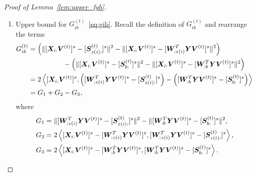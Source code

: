 \documentclass[lettersize,onecolumn,journal]{IEEEtran}
\theoremstyle{definition}
\theoremstyle{definition}
\newcommand{\of}[1]{\left(#1\right)}
\newcommand{\ang}[1]{\left\langle#1\right\rangle}
\begin{document}
\begin{proof}[Proof of Lemma~\ref{lem:upper_fgh}]
\begin{enumerate}
    Also note that 
    \begin{align}
        \onormSize{}{  [  \tilde \mS_{z(i):} ]^s - [  \tilde \mS_{b:} ]^s  }^2 &=  \onormSize{}{  [  \tilde \mS_{z(i):} ]^s -[ \mS_{z(i):} ]^s +  [ \mS_{z(i):} ]^s - [ \mS_{b:} ]^s + [ \mS_{b:} ]^s -[  \tilde \mS_{b:} ]^s  }^2 \\
        & \lesssim \onormSize{}{ [ \mS_{z(i):} ]^s - [ \mS_{b:} ]^s }^2 + \max_{a \in [r]} \onormSize{}{ [ \mS_{a:} ]^s -[  \tilde \mS_{a:} ]^s }^2 \\
        & \lesssim \onormSize{}{ [ \mS_{z(i):} ]^s - [ \mS_{b:} ]^s }^2  + \max_{a \in [r]} \frac{1}{\onormSize{}{\mS_{a:} }^2} \onormSize{}{ \mW_{:a}^T \mE \mV}^2\\
        & \lesssim \onormSize{}{ [ \mS_{z(i):} ]^s - [ \mS_{b:} ]^s }^2,
    \end{align}
    where the second inequality follows by Lemma~\ref{lem:norm_diff}, and the last inequality follows by the assumptions on $\onormSize{}{\mS_{a:}}$ in the parameter space~\eqref{eq:family}, the inequality~\eqref{eq:cond1} Condition~\ref{cond:origin} and the assumption $\Delta_{\min}^2 \gtrsim p^{-K/2}\log p$. 
    
    Therefore, we finish the proof of inequality~\eqref{eq:fib}.
    
    \item Upper bound for $G_{ib}^{(t)}$~\eqref{eq:gib}. Recall the definition of $G_{ib}^{(t)}$ and rearrange the terms
    \begin{align}
        G_{ib}^{(t)} &=   \of{ \onormSize{}{ [\mX_{i:} \mV^{(t)}]^s -  [  \mS_{z(i):}^{(t)}  ]^s}^2 -  \onormSize{}{ [\mX_{i:} \mV^{(t)}]^s -  [  \mW_{:z(i)}^T \mY \mV^{(t)} ]^s}^2}   \\
        & \quad \quad \quad \quad \quad -   \of{ \onormSize{}{ [\mX_{i:} \mV^{(t)}]^s -  [  \mS_{b:}^{(t)}  ]^s}^2 -  \onormSize{}{ [\mX_{i:} \mV^{(t)}]^s -  [  \mW_{:b}^T \mY \mV^{(t)} ]^s}^2 } \\
        &= 2 \ang{  [\mX_{i:} \mV^{(t)}]^s , \of{[  \mW_{:z(i)}^T \mY \mV^{(t)} ]^s -  [  \mS_{z(i):}^{(t)}  ]^s } - \of{ [  \mW_{:b}^T \mY \mV^{(t)} ]^s -  [  \mS_{b:}^{(t)}  ]^s }}\\
        &= G_1 + G_2 - G_3,
    \end{align}
    where 
    \begin{align}
        G_1 &= \onormSize{}{ [  \mW_{:z(i)}^T \mY \mV^{(t)} ]^s -  [  \mS_{z(i):}^{(t)}  ]^s}^2 - \onormSize{}{ [  \mW_{:b}^T \mY \mV^{(t)} ]^s -  [  \mS_{b:}^{(t)}  ]^s }^2,\\
        G_2 &= 2 \ang{ [\mX_{i:} \mV^{(t)}]^s  -  [  \mW_{:z(i)}^T \mY \mV^{(t)} ]^s,   [  \mW_{:z(i)}^T \mY \mV^{(t)} ]^s -  [  \mS_{z(i):}^{(t)}  ]^s},\\
        G_3 & = 2 \ang{ [\mX_{i:} \mV^{(t)}]^s  -  [  \mW_{:b}^T \mY \mV^{(t)} ]^s,  [  \mW_{:b}^T \mY \mV^{(t)} ]^s -  [  \mS_{b:}^{(t)}  ]^s}.
    \end{align}
    

\end{enumerate}
\end{proof}
\end{document}

